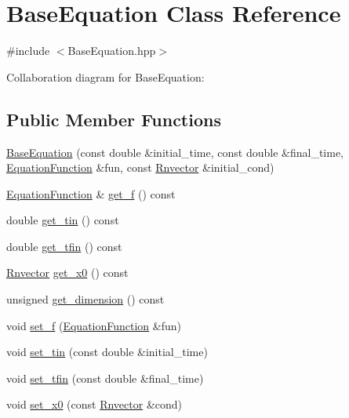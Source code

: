 \hypertarget{classBaseEquation}{}\section{Base\+Equation Class Reference}
\label{classBaseEquation}


{\ttfamily \#include $<$Base\+Equation.\+hpp$>$}



Collaboration diagram for Base\+Equation\+:
\subsection*{Public Member Functions}
\begin{DoxyCompactItemize}
\item 
\hyperlink{classBaseEquation_a649e9bef29ad2885442750f72fde0d69}{Base\+Equation} (const double \&initial\+\_\+time, const double \&final\+\_\+time, \hyperlink{structEquationFunction}{Equation\+Function} \&fun, const \hyperlink{utils_8hpp_a8e0cccfe9e5cee5140bfcfbd9a3a6a0e}{Rnvector} \&initial\+\_\+cond)
\item 
\hyperlink{structEquationFunction}{Equation\+Function} \& \hyperlink{classBaseEquation_ad5575137eeccd996ad27ed20ef3d7f69}{get\+\_\+f} () const
\item 
double \hyperlink{classBaseEquation_ae208cf521727cbdba9f830948a9b434e}{get\+\_\+tin} () const
\item 
double \hyperlink{classBaseEquation_a013b3adfbbc50e6d56f07a1d0831d3fa}{get\+\_\+tfin} () const
\item 
\hyperlink{utils_8hpp_a8e0cccfe9e5cee5140bfcfbd9a3a6a0e}{Rnvector} \hyperlink{classBaseEquation_a7e801dee1909932f54ba022d67cb6ebd}{get\+\_\+x0} () const
\item 
unsigned \hyperlink{classBaseEquation_a904f532d60a0a3bfab3e317cfc35c171}{get\+\_\+dimension} () const
\item 
void \hyperlink{classBaseEquation_afc56728c1331f42263959a6a6d13b2e1}{set\+\_\+f} (\hyperlink{structEquationFunction}{Equation\+Function} \&fun)
\item 
void \hyperlink{classBaseEquation_a483e1f4df9e791cec7f911b5cff0083a}{set\+\_\+tin} (const double \&initial\+\_\+time)
\item 
void \hyperlink{classBaseEquation_a252acc3f65baabe91d21280bd911c745}{set\+\_\+tfin} (const double \&final\+\_\+time)
\item 
void \hyperlink{classBaseEquation_a07152aa622647f9a2b0e10c5ce330193}{set\+\_\+x0} (const \hyperlink{utils_8hpp_a8e0cccfe9e5cee5140bfcfbd9a3a6a0e}{Rnvector} \&cond)
\end{DoxyCompactItemize}
